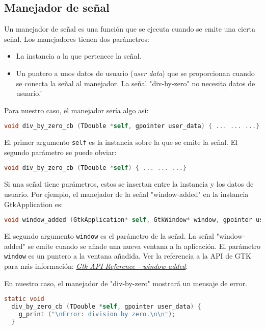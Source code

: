 \subsection{Manejador de señal}
Un manejador de señal es una función que se ejecuta cuando se emite una cierta señal.
Los manejadores tienen dos parámetros:
\vspace{-\topsep}
\begin{itemize}
  \tightlist
\item La instancia a la que pertenece la señal.
\item Un puntero a unos datos de usuario (\emph{user data}) que se proporcionan cuando
  se conecta la señal al manejador. La señal \textsf{"div-by-zero"} no necesita datos de
  usuario.'
\end{itemize}

Para nuestro caso, el manejador sería algo así:
\begin{lstlisting}[language=C, numbers=none]
  void div_by_zero_cb (TDouble *self, gpointer user_data) { ... ... ...}
\end{lstlisting}
El primer argumento \texttt{self} es la instancia sobre la que se emite la señal. El segundo parámetro se puede obviar:
\begin{lstlisting}[language=C, numbers=none]
  void div_by_zero_cb (TDouble *self) { ... ... ...}
\end{lstlisting}

Si una señal tiene parámetros, estos se insertan entre la instancia y los datos de
usuario.
Por ejemplo, el manejador de la señal \textsf{"window-added"} en la instancia  \textsf{GtkApplication} es:
\begin{lstlisting}[language=C, numbers=none]
  void window_added (GtkApplication* self, GtkWindow* window, gpointer user_data);
\end{lstlisting}
El segundo argumento \texttt{window} es el parámetro de la señal. La señal \textsf{"window-added"} se emite cuando se añade una nueva ventana a la aplicación.
El parámetro \texttt{window} es un puntero a la ventana añadida. Ver la referencia a la API de GTK para más información:
\href{https://docs.gtk.org/gtk4/signal.Application.window-added.html}
{\emph{\textsf{Gtk API Reference - window-added}}}.      

En nuestro caso, el manejador de \textsf{"div-by-zero"} mostrará un mensaje de error.
\begin{lstlisting}[language=C, numbers=none]
  static void
  div_by_zero_cb (TDouble *self, gpointer user_data) {
    g_print ("\nError: division by zero.\n\n");
  }
\end{lstlisting}

